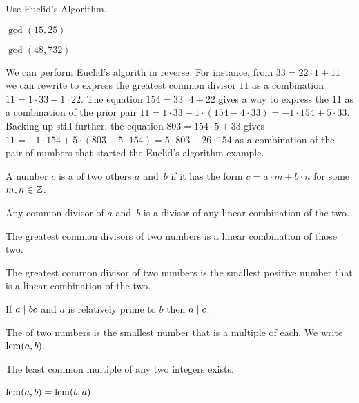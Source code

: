 \documentclass{ibl}
\begin{document}
\begin{ex}
Use Euclid's Algorithm.
\begin{exes}
\item $\gcd(15,25)$
\item $\gcd(48,732)$  
\end{exes}
\end{ex}

We can perform Euclid's algorith in reverse.
For instance, from $33=22\cdot 1+11$ we can rewrite to 
express the greatest common divisor $11$ as a combination 
$11=1\cdot 33-1\cdot 22$.
The equation $154=33\cdot 4+22$ gives a way to express
the $11$ as a combination of the prior pair
$11=1\cdot 33-1\cdot (154-4\cdot 33)=-1\cdot 154+5\cdot 33$.
Backing up still further, the equation 
$803=154\cdot 5+33$
gives $11=-1\cdot 154+5\cdot (803-5\cdot 154)=5\cdot 803-26\cdot 154$
as a combination of the pair of numbers that started the
Euclid's algorithm example.

\begin{df}
A number $c$ is a  of two others $a$ and~$b$
if it has the form $c=a\cdot m+b\cdot n$ for some $m,n\in\mathbb{Z}$.  
\end{df}

\begin{ex}
\begin{exes}
\item Any common divisor of $a$ and~$b$ is a divisor of 
any linear combination of the two.
\item The greatest common divisors of two numbers is a linear combination of 
those two.
\item The greatest common divisor of two numbers is the smallest positive
number that is a linear combination of the two.
\end{exes}
\end{ex}

\begin{ex}
If $a\mid bc$ and $a$ is relatively prime to $b$ then $a\mid c$.  
\end{ex}

\begin{df}
The  of two numbers is the smallest number
that is a multiple of each.
We write $\operatorname{lcm}(a,b)$.
\end{df}

\begin{ex} 
\begin{exes}
\item The least common multiple of any two integers exists.
\item $\operatorname{lcm}(a,b)=\operatorname{lcm}(b,a)$.
\end{exes}
\end{ex}
\end{document}

